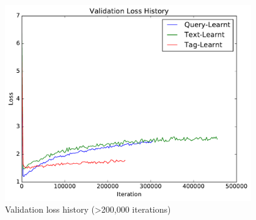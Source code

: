\begin{figure}[h]
    \centering
    \includegraphics[width=0.95\textwidth]{graphs/validation-loss-history}
    \caption{Validation loss history (\textgreater 200,000 iterations)}
    \label{fig:val-loss-2}
\end{figure}